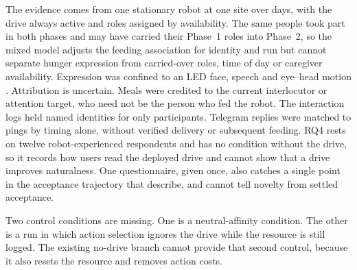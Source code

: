 The evidence comes from one stationary robot at one site over \CoreDeploymentDays{} days, with the drive always active and roles assigned by availability. The same people took part in both phases and may have carried their Phase~1 roles into Phase~2, so the mixed model adjusts the feeding association for identity and run but cannot separate hunger expression from carried-over roles, time of day or caregiver availability. Expression was confined to an LED face, speech and eye--head motion \citep{Metta2010ICub}. Attribution is uncertain. Meals were credited to the current interlocutor or attention target, who need not be the person who fed the robot. The interaction logs held \CoreNamedIdentities{} named identities for only \CoreQuestionnaireRespondents{} participants. Telegram replies were matched to pings by timing alone, without verified delivery or subsequent feeding. RQ4 rests on twelve robot-experienced respondents and has no condition without the drive, so it records how users read the deployed drive and cannot show that a drive improves naturalness. One questionnaire, given once, also catches a single point in the acceptance trajectory that \citet{DeGraaf2016LongTermAcceptance} describe, and cannot tell novelty from settled acceptance.

Two control conditions are missing. One is a neutral-affinity condition. The other is a run in which action selection ignores the drive while the resource is still logged. The existing no-drive branch cannot provide that second control, because it also resets the resource and removes action costs.
